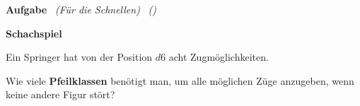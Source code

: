 \documentclass[11pt,a4paper]{article}
\newif\ifloesungen
\newcommand{\loesung}[1]{%
  \ifloesungen
    \begin{tcolorbox}[colback=green!5,colframe=green!50!black,
      title=Lösung,fonttitle=\bfseries\small,breakable]#1\end{tcolorbox}
  \fi}
\newcommand{\schreibplatz}[1]{\ifloesungen\else\vspace{#1}\fi}
\newcounter{aufgabe}
\let\aufgabenzusatz\relax
\newcommand{\fuerdieschnellen}{\gdef\aufgabenzusatz{\quad
  {\color{orange!80!black}\faLightbulb[regular]}~{\small\itshape (Für die Schnellen)}}}
\newenvironment{aufgabe}[2][]{%
  \Needspace{#2}%
  \refstepcounter{aufgabe}%
  \par\medskip\noindent\textbf{Aufgabe \theaufgabe}%
  \aufgabenzusatz\global\let\aufgabenzusatz\relax
  \if\relax\detokenize{#1}\relax\else\ \textit{(#1)}\fi\par\nopagebreak}%
  {\par}
\begin{document}
\fuerdieschnellen
\begin{aufgabe}{8cm}
  \begin{minipage}[c]{0.45\linewidth}
    \centering
  \end{minipage}\hfill
  \begin{minipage}[c]{0.5\linewidth}
    \textbf{Schachspiel}\par\smallskip
    Ein Springer hat von der Position $d6$ acht Zugmöglichkeiten.

    Wie viele \textbf{Pfeilklassen} benötigt man, um alle möglichen Züge
    anzugeben, wenn keine andere Figur stört?
  \end{minipage}
  \schreibplatz{3cm}
  \loesung{
    Man benötigt \textbf{acht} Pfeilklassen: Jeder der acht Züge
    (z.\,B.\ 2 Felder nach rechts und 1 nach oben, 1 nach rechts und 2 nach
    oben, \ldots) hat eine andere Richtung bzw.\ Orientierung. Mit diesen
    acht Pfeilklassen lassen sich die Springerzüge von \emph{jedem} Feld aus
    beschreiben -- egal, wo der Springer steht.
  }
\end{aufgabe}
\end{document}
